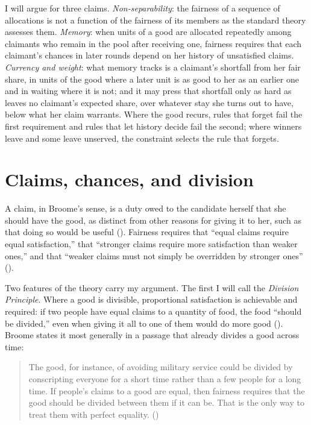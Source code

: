 \documentclass[
  11pt,
  letterpaper,
  DIV=11,
  numbers=noendperiod,
  twoside]{scrartcl}
\begin{document}
I will argue for three claims. \emph{Non-separability}: the fairness of
a sequence of allocations is not a function of the fairness of its
members as the standard theory assesses them. \emph{Memory}: when units
of a good are allocated repeatedly among claimants who remain in the
pool after receiving one, fairness requires that each claimant's chances
in later rounds depend on her history of unsatisfied claims.
\emph{Currency and weight}: what memory tracks is a claimant's shortfall
from her fair share, in units of the good where a later unit is as good
to her as an earlier one and in waiting where it is not; and it may
press that shortfall only as hard as leaves no claimant's expected
share, over whatever stay she turns out to have, below what her claim
warrants. Where the good recurs, rules that forget fail the first
requirement and rules that let history decide fail the second; where
winners leave and some leave unserved, the constraint selects the rule
that forgets.

\section{Claims, chances, and division}\label{sec-broome}

A claim, in Broome's sense, is a duty owed to the candidate herself that
she should have the good, as distinct from other reasons for giving it
to her, such as that doing so would be useful
(). Fairness requires
that ``equal claims require equal satisfaction,'' that ``stronger claims
require more satisfaction than weaker ones,'' and that ``weaker claims
must not simply be overridden by stronger ones''
().

Two features of the theory carry my argument. The first I will call the
\emph{Division Principle}. Where a good is divisible, proportional
satisfaction is achievable and required: if two people have equal claims
to a quantity of food, the food ``should be divided,'' even when giving
it all to one of them would do more good
(). Broome states it most
generally in a passage that already divides a good across time:

\begin{quote}
The good, for instance, of avoiding military service could be divided by
conscripting everyone for a short time rather than a few people for a
long time. If people's claims to a good are equal, then fairness
requires that the good should be divided between them if it can be. That
is the only way to treat them with perfect equality.
()
\end{quote}
\end{document}
